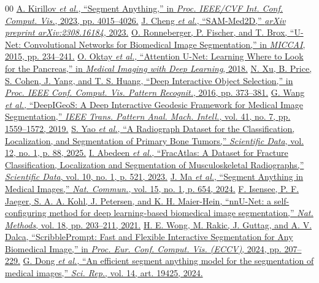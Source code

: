 \begin{thebibliography}{00}
 \href{https://arxiv.org/abs/2304.02643}{A. Kirillov \textit{et al.}, ``Segment Anything,'' in \textit{Proc. IEEE/CVF Int. Conf. Comput. Vis.}, 2023, pp. 4015--4026.}
 \href{https://arxiv.org/abs/2308.16184}{J. Cheng \textit{et al.}, ``SAM-Med2D,'' \textit{arXiv preprint arXiv:2308.16184}, 2023.}
 \href{https://arxiv.org/abs/1505.04597}{O. Ronneberger, P. Fischer, and T. Brox, ``U-Net: Convolutional Networks for Biomedical Image Segmentation,'' in \textit{MICCAI}, 2015, pp. 234--241.}
 \href{https://arxiv.org/abs/1804.03999}{O. Oktay \textit{et al.}, ``Attention U-Net: Learning Where to Look for the Pancreas,'' in \textit{Medical Imaging with Deep Learning}, 2018.}
 \href{https://arxiv.org/abs/1603.04042}{N. Xu, B. Price, S. Cohen, J. Yang, and T. S. Huang, ``Deep Interactive Object Selection,'' in \textit{Proc. IEEE Conf. Comput. Vis. Pattern Recognit.}, 2016, pp. 373--381.}
 \href{https://doi.org/10.1109/TPAMI.2018.2840695}{G. Wang \textit{et al.}, ``DeepIGeoS: A Deep Interactive Geodesic Framework for Medical Image Segmentation,'' \textit{IEEE Trans. Pattern Anal. Mach. Intell.}, vol. 41, no. 7, pp. 1559--1572, 2019.}
 \href{https://www.nature.com/articles/s41597-024-04311-y}{S. Yao \textit{et al.}, ``A Radiograph Dataset for the Classification, Localization, and Segmentation of Primary Bone Tumors,'' \textit{Scientific Data}, vol. 12, no. 1, p. 88, 2025.}
 \href{https://www.nature.com/articles/s41597-023-02432-4}{I. Abedeen \textit{et al.}, ``FracAtlas: A Dataset for Fracture Classification, Localization and Segmentation of Musculoskeletal Radiographs,'' \textit{Scientific Data}, vol. 10, no. 1, p. 521, 2023.}
 \href{https://www.nature.com/articles/s41467-024-44824-z}{J. Ma \textit{et al.}, ``Segment Anything in Medical Images,'' \textit{Nat. Commun.}, vol. 15, no. 1, p. 654, 2024.}
 \href{https://www.nature.com/articles/s41592-020-01008-z}{F. Isensee, P. F. Jaeger, S. A. A. Kohl, J. Petersen, and K. H. Maier-Hein, ``nnU-Net: a self-configuring method for deep learning-based biomedical image segmentation,'' \textit{Nat. Methods}, vol. 18, pp. 203--211, 2021.}
 \href{https://arxiv.org/abs/2312.07381}{H. E. Wong, M. Rakic, J. Guttag, and A. V. Dalca, ``ScribblePrompt: Fast and Flexible Interactive Segmentation for Any Biomedical Image,'' in \textit{Proc. Eur. Conf. Comput. Vis. (ECCV)}, 2024, pp. 207--229.}
 \href{https://www.nature.com/articles/s41598-024-70288-8}{G. Dong \textit{et al.}, ``An efficient segment anything model for the segmentation of medical images,'' \textit{Sci. Rep.}, vol. 14, art. 19425, 2024.}

\end{thebibliography}
